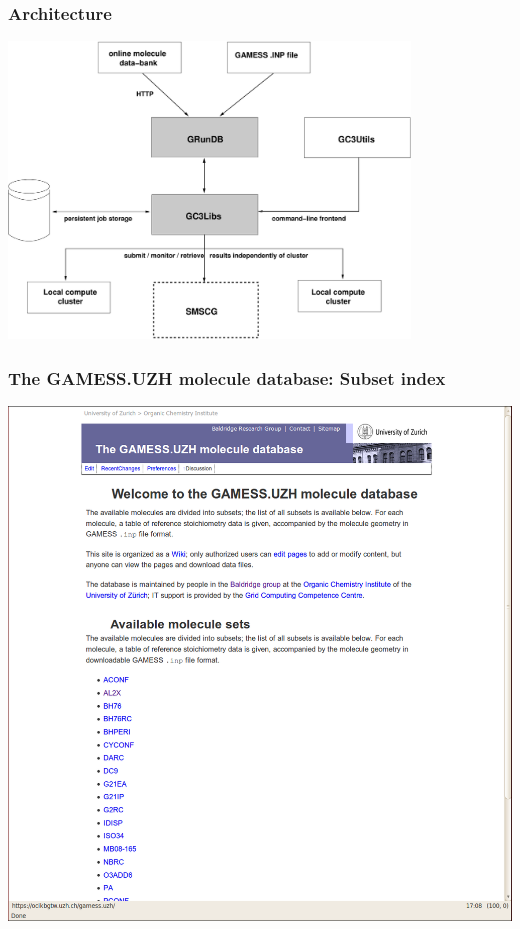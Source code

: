 \documentclass {beamer}
\begin{document}
\begin{frame}
  \frametitle{Architecture}

  \begin{center}
    \includegraphics[width=0.8\textwidth]{architecture}
  \end{center}
\end{frame}

\begin{frame}
  \frametitle{The GAMESS.UZH molecule database: Subset index}
  \begin{center}
    \includegraphics[height=0.9\textheight]{gamess-uzh-1}
  \end{center}
\end{frame}
\end{document}
